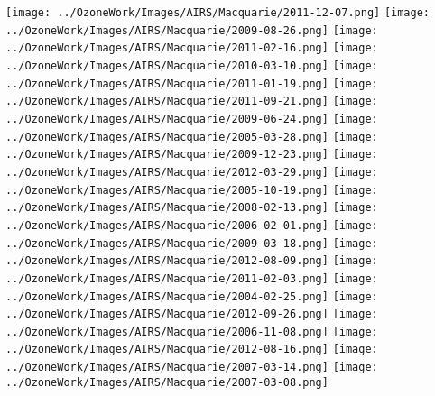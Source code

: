   \texttt{[image: ../OzoneWork/Images/AIRS/Macquarie/2011-12-07.png]}
  \texttt{[image: ../OzoneWork/Images/AIRS/Macquarie/2009-08-26.png]}
  \texttt{[image: ../OzoneWork/Images/AIRS/Macquarie/2011-02-16.png]}
  \texttt{[image: ../OzoneWork/Images/AIRS/Macquarie/2010-03-10.png]}
  \texttt{[image: ../OzoneWork/Images/AIRS/Macquarie/2011-01-19.png]}
  \texttt{[image: ../OzoneWork/Images/AIRS/Macquarie/2011-09-21.png]}
  \texttt{[image: ../OzoneWork/Images/AIRS/Macquarie/2009-06-24.png]}
  \texttt{[image: ../OzoneWork/Images/AIRS/Macquarie/2005-03-28.png]}
  \texttt{[image: ../OzoneWork/Images/AIRS/Macquarie/2009-12-23.png]}
  \texttt{[image: ../OzoneWork/Images/AIRS/Macquarie/2012-03-29.png]}
  \texttt{[image: ../OzoneWork/Images/AIRS/Macquarie/2005-10-19.png]}
  \texttt{[image: ../OzoneWork/Images/AIRS/Macquarie/2008-02-13.png]}
  \texttt{[image: ../OzoneWork/Images/AIRS/Macquarie/2006-02-01.png]}
  \texttt{[image: ../OzoneWork/Images/AIRS/Macquarie/2009-03-18.png]}
  \texttt{[image: ../OzoneWork/Images/AIRS/Macquarie/2012-08-09.png]}
  \texttt{[image: ../OzoneWork/Images/AIRS/Macquarie/2011-02-03.png]}
  \texttt{[image: ../OzoneWork/Images/AIRS/Macquarie/2004-02-25.png]}
  \texttt{[image: ../OzoneWork/Images/AIRS/Macquarie/2012-09-26.png]}
  \texttt{[image: ../OzoneWork/Images/AIRS/Macquarie/2006-11-08.png]}
  \texttt{[image: ../OzoneWork/Images/AIRS/Macquarie/2012-08-16.png]}
  \texttt{[image: ../OzoneWork/Images/AIRS/Macquarie/2007-03-14.png]}
  \texttt{[image: ../OzoneWork/Images/AIRS/Macquarie/2007-03-08.png]}
